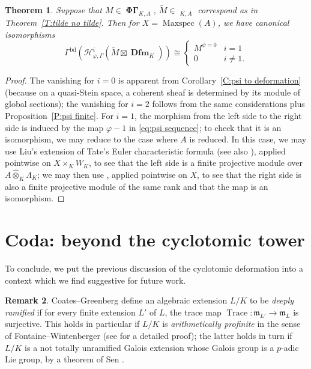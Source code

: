 \documentclass[12pt]{amsart}
\newtheorem{theorem}{Theorem}[section]
\theoremstyle{definition}
\newtheorem{remark}[theorem]{Remark}
\numberwithin{equation}{theorem}
\newcommand{\calH}{\mathcal{H}}
\newcommand{\frakm}{\mathfrak{m}}
\DeclareMathOperator{\bd}{bd}
\DeclareMathOperator{\Dfm}{\mathbf{Dfm}}
\DeclareMathOperator{\Maxspec}{Maxspec}
\DeclareMathOperator{\PhiGamma}{\mathbf{\Phi \Gamma}}
\DeclareMathOperator{\PhiGammatilde}{\widetilde{\mathbf{\Phi \Gamma}}}
\DeclareMathOperator{\Trace}{Trace}
\begin{document}
\begin{theorem} \label{T:psi kernel}
Suppose that $M \in \PhiGamma_{K,A}$,
$\tilde{M} \in \PhiGammatilde_{K,A}$ correspond as in
Theorem~\ref{T:tilde no tilde}.
Then for $X = \Maxspec(A)$,
we have canonical isomorphisms
\[
\Gamma^{\bd}(\calH^i_{\varphi,\Gamma}(\tilde{M} \boxtimes \Dfm_K)) \cong \begin{cases} M^{\psi=0} & i=1 \\ 0 & i \neq 1.
\end{cases}
\]
\end{theorem}
\begin{proof}
The vanishing for $i=0$ is apparent from Corollary~\ref{C:psi to deformation}
(because on a quasi-Stein space, a coherent sheaf is determined by its module of global sections); the vanishing for $i=2$ follows from the same considerations plus 
Proposition~\ref{P:psi finite}. For $i=1$, the morphism from the left side to the right side is induced by the map $\varphi-1$ in \eqref{eq:psi sequence}; to check that it is an isomorphism, we may reduce to the case where $A$ is reduced. In this case, we may
use Liu's extension of Tate's Euler characteristic formula \cite{liu-herr} (see also \cite[Theorem~2.3.11]{kpx}), applied pointwise on $X \times_K W_K$,
to see that the left side is a finite projective module over $A \widehat{\otimes}_K \Lambda_K$; we may then use \cite[Proposition~4.3.8]{kpx}, applied pointwise on $X$, to see that the right side is also a finite projective module of the same rank and that the map is an isomorphism.
\end{proof}

\section{Coda: beyond the cyclotomic tower}
\label{sec:coda}

To conclude, we put the previous discussion of the cyclotomic deformation into a context which we find suggestive for future work.

\begin{remark} \label{R:deeply ramified}
Coates--Greenberg \cite{coates-greenberg} define an algebraic extension $L/K$ to be
\emph{deeply ramified} if for every finite extension $L'$ of $L$, the trace map
$\Trace: \frakm_{L'} \to \frakm_L$ is surjective. This holds in particular if $L/K$ is 
\emph{arithmetically profinite} in the sense of Fontaine--Wintenberger
\cite{fontaine-wintenberger} (see \cite[Corollary~1.5]{fesenko} for a detailed proof);
the latter holds in turn if $L/K$ is a not totally unramified Galois extension whose Galois group is a $p$-adic Lie group, by a theorem of Sen \cite{sen-lie}.
\end{remark}
\end{document}
